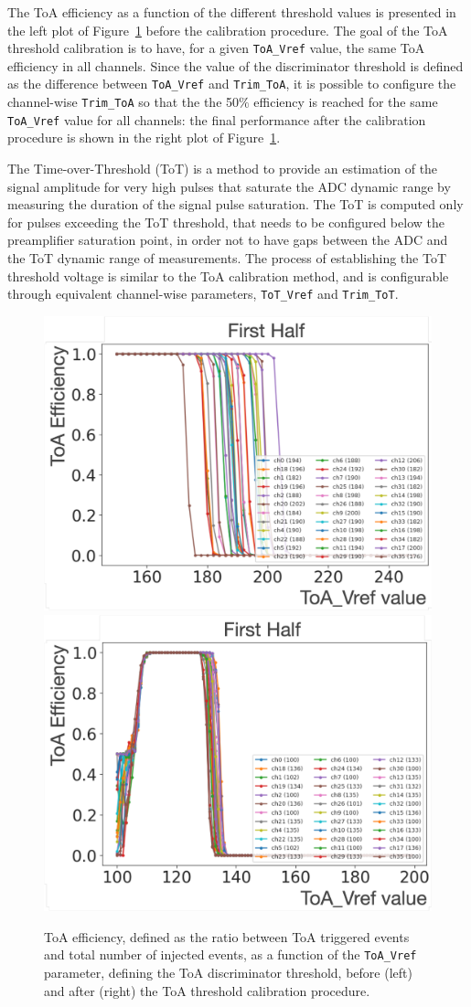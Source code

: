 The ToA efficiency as a function of the different threshold values is presented in the left plot of Figure~\ref{fig:ToAEff} before the calibration procedure.
The goal of the ToA threshold calibration is to have, for a given \texttt{ToA\_Vref} value, the same ToA efficiency in all channels. 
Since the value of the discriminator threshold is defined as the difference between \texttt{ToA\_Vref} and \texttt{Trim\_ToA}, it is possible to configure the channel-wise \texttt{Trim\_ToA} so that the the 50$\%$ efficiency is reached for the same \texttt{ToA\_Vref} value for all channels: the final performance after the calibration procedure is shown in the right plot of Figure~\ref{fig:ToAEff}.

\bigbreak

The Time-over-Threshold (ToT) is a method to provide an estimation of the signal amplitude for very high pulses that saturate the ADC dynamic range by measuring the duration of the signal pulse saturation. 
The ToT is computed only for pulses exceeding the ToT threshold, that needs to be configured below the preamplifier saturation point, in order not to have gaps between the ADC and the ToT dynamic range of measurements. The process of establishing the ToT threshold voltage is similar to the ToA calibration method, and is configurable through equivalent channel-wise parameters, \texttt{ToT\_Vref} and \texttt{Trim\_ToT}.

\begin{figure}
    \centering
    \includegraphics[width=0.49\linewidth]{Figures/HGCAL/ToA_Eff_0.pdf}
    \includegraphics[width=0.49\linewidth]{Figures/HGCAL/ToA_Eff_1.pdf}
    \caption{ToA efficiency, defined as the ratio between ToA triggered events and total number of injected events, as a function of the \texttt{ToA\_Vref} parameter, defining the ToA discriminator threshold, before (left) and after (right) the ToA threshold calibration procedure.}
    \label{fig:ToAEff}
\end{figure}

